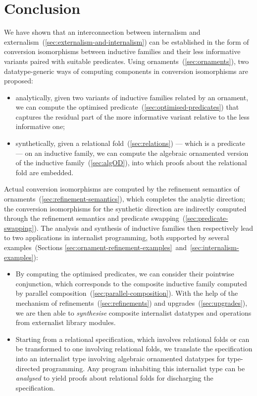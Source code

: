 \chapter{Conclusion}
\label{chap:conclusion}

We have shown that an interconnection between internalism and externalism~(\autoref{sec:externalism-and-internalism}) can be established in the form of conversion isomorphisms between inductive families and their less informative variants paired with suitable predicates.
Using ornaments~(\autoref{sec:ornaments}), two datatype-generic ways of computing components in conversion isomorphisms are proposed:
\begin{itemize}
\item analytically, given two variants of inductive families related by an ornament, we can compute the optimised predicate~(\autoref{sec:optimised-predicates}) that captures the residual part of the more informative variant relative to the less informative one;
\item synthetically, given a relational fold~(\autoref{sec:relations}) --- which is a predicate --- on an inductive family, we can compute the algebraic ornamented version of the inductive family~(\autoref{sec:algOD}), into which proofs about the relational fold are embedded.
\end{itemize}
Actual conversion isomorphisms are computed by the refinement semantics of ornaments~(\autoref{sec:refinement-semantics}), which completes the analytic direction; the conversion isomorphisms for the synthetic direction are indirectly computed through the refinement semantics and predicate swapping~(\autoref{sec:predicate-swapping}).
The analysis and synthesis of inductive families then respectively lead to two applications in internalist programming, both supported by several examples~(Sections \ref{sec:ornament-refinement-examples}~and~\ref{sec:internalism-examples}):
\begin{itemize}
\item By computing the optimised predicates, we can consider their pointwise conjunction, which corresponds to the composite inductive family computed by parallel composition~(\autoref{sec:parallel-composition}).
With the help of the mechanism of refinements~(\autoref{sec:refinements}) and upgrades~(\autoref{sec:upgrades}), we are then able to \emph{synthesise} composite internalist datatypes and operations from externalist library modules.
\item Starting from a relational specification, which involves relational folds or can be transformed to one involving relational folds, we translate the specification into an internalist type involving algebraic ornamented datatypes for type-directed programming.
Any program inhabiting this internalist type can be \emph{analysed} to yield proofs about relational folds for discharging the specification.
\end{itemize}
